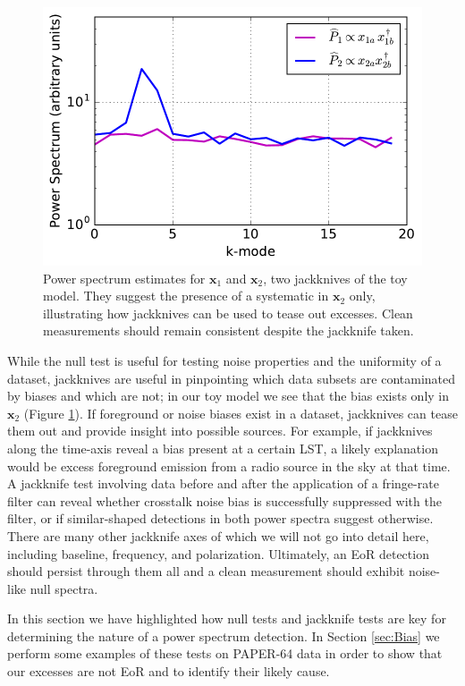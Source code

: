 \documentclass[preprint2,numberedappendix,tighten]{aastex6}  %
\begin{document}
\begin{figure}
	\centering
	\includegraphics[trim={0cm 0cm 0cm 0cm},width=\columnwidth]{plots/toy_bias2.pdf}
	\caption{Power spectrum estimates for $\textbf{x}_{1}$ and $\textbf{x}_{2}$, two jackknives of the toy model. They suggest 
the presence of a systematic in $\textbf{x}_{2}$ only, illustrating how jackknives can be used to tease out excesses. Clean 
measurements should remain consistent despite the jackknife taken.}
	\label{fig:toy_bias2}
\end{figure}

While the null test is useful for testing noise properties and the uniformity of a dataset, jackknives are useful in pinpointing 
which data subsets are contaminated by biases and which are not; in our toy model we see that the bias exists only in $
\textbf{x}_{2}$ (Figure \ref{fig:toy_bias2}). If foreground or noise biases exist in a dataset, jackknives can tease them out and 
provide insight into possible sources. For example, if jackknives along the time-axis reveal a bias present at a certain LST, a 
likely explanation would be excess foreground emission from a radio source in the sky at that time. A jackknife test involving 
data before and after the application of a fringe-rate filter can reveal whether crosstalk noise bias is successfully suppressed 
with the filter, or if similar-shaped detections in both power spectra suggest otherwise. There are many other jackknife axes of 
which we will not go into detail here, including baseline, frequency, and polarization. Ultimately, an EoR detection should persist 
through them all and a clean measurement should exhibit noise-like null spectra.

In this section we have highlighted how null tests and jackknife tests are key for determining the nature of a power spectrum 
detection. In Section \ref{sec:Bias} we perform some examples of these tests on PAPER-64 data in order to show that our 
excesses are not EoR and to identify their likely cause. 
\end{document}
